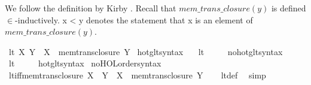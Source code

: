 \begin{isabellebody}
%
\isatagdocument
%
\isamarkuptrue%
%
\endisatagdocument
{\isafolddocument}%
%
\isadelimdocument
%
\endisadelimdocument
%
\begin{isamarkuptext}%
We follow the definition by Kirby \cite{kirby_set_arithemtics}. Recall that $mem\_trans\_closure(y)$ 
is defined $\in$-inductively. x < y denotes the statement that x is an 
element of $mem\_trans\_closure(y)$.%
\end{isamarkuptext}\isamarkuptrue%
\isamarkupfalse%
\ {\isachardoublequoteopen}lt\ X\ Y\ {\isasymequiv}\ X\ {\isasymin}\ mem{\isacharunderscore}{\kern0pt}trans{\isacharunderscore}{\kern0pt}closure\ Y{\isachardoublequoteclose}\isanewline
\isanewline
{}\isamarkupfalse%
\ hotg{\isacharunderscore}{\kern0pt}lt{\isacharunderscore}{\kern0pt}syntax\ \ \isamarkupfalse%
\ lt\ {\isacharparenleft}{\kern0pt}\ {\isachardoublequoteopen}{\isacharless}{\kern0pt}{\isachardoublequoteclose}\ {}{}{\isacharparenright}{\kern0pt}\ \isamarkupfalse%
\isanewline
{}\isamarkupfalse%
\ no{\isacharunderscore}{\kern0pt}hotg{\isacharunderscore}{\kern0pt}lt{\isacharunderscore}{\kern0pt}syntax\ \ \isamarkupfalse%
\ lt\ {\isacharparenleft}{\kern0pt}\ {\isachardoublequoteopen}{\isacharless}{\kern0pt}{\isachardoublequoteclose}\ {}{}{\isacharparenright}{\kern0pt}\ \isamarkupfalse%
\isanewline
{}\isamarkupfalse%
\ hotg{\isacharunderscore}{\kern0pt}lt{\isacharunderscore}{\kern0pt}syntax\isanewline
{}\isamarkupfalse%
\ no{\isacharunderscore}{\kern0pt}HOL{\isacharunderscore}{\kern0pt}order{\isacharunderscore}{\kern0pt}syntax\isanewline
\isanewline
{}\isamarkupfalse%
\ lt{\isacharunderscore}{\kern0pt}iff{\isacharunderscore}{\kern0pt}mem{\isacharunderscore}{\kern0pt}trans{\isacharunderscore}{\kern0pt}closure{\isacharcolon}{\kern0pt}\ {\isachardoublequoteopen}X\ {\isacharless}{\kern0pt}\ Y\ {\isasymlongleftrightarrow}\ X\ {\isasymin}\ mem{\isacharunderscore}{\kern0pt}trans{\isacharunderscore}{\kern0pt}closure\ Y{\isachardoublequoteclose}\isanewline
%
\isadelimproof
\ \ %
\endisadelimproof
%
\isatagproof
{}\isamarkupfalse%
\ lt{\isacharunderscore}{\kern0pt}def\ \isamarkupfalse%
\ simp%
\endisatagproof
{\isafoldproof}%
%
\isadelimproof
\isanewline
%
\endisadelimproof
\isanewline

\end{isabellebody}

